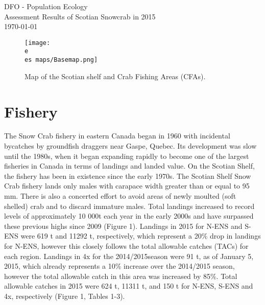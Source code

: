 \documentclass[paper=a4, fontsize=11pt]{article}
\newcommand{\e}{/home/michelle/ecomod_data/}
\newcommand{\es}{snowcrab/}
\begin{document}
  \begin{titlepage}
  \vspace*{\fill}
  \begin{center}
    {DFO - Population Ecology}\\[0.5cm]
    {Assessment Results of Scotian Snowcrab in 2015}\\[0.4cm]
    {\normalsize\today}
\begin{figure} [h]
\centering
  \texttt{[image: \\e \\es maps/Basemap.png]}
  \caption{Map of the Scotian shelf and Crab Fishing Areas (CFAs).}
 \end{figure}
 \end{center}
\vspace*{\fill}
\end{titlepage}


\section{Fishery}
The Snow Crab fishery in eastern Canada began in 1960 with incidental bycatches by groundfish draggers near Gaspe, Quebec. Its development was slow until the 1980s, when it began expanding rapidly to become one of the largest fisheries in Canada in terms of landings and landed value. On the Scotian Shelf, the fishery has been in existence since the early 1970s. The Scotian Shelf Snow Crab fishery lands only males with carapace width greater than or equal to 95 mm. There is also a concerted effort to avoid areas of newly moulted (soft shelled) crab and to discard immature males. Total landings increased to record levels of approximately 10 000t each year in the early 2000s and have surpassed these previous highs since 2009 (Figure 1). Landings in 2015 for N-ENS and S-ENS were 619 t and 11292 t, respectively, which represent a 20\% drop in landings for N-ENS, however this closely follows the total allowable catches (TACs) for each region. Landings in 4x for the 2014/2015season were 91 t, as of January 5, 2015, which already represents a 10\% increase over the 2014/2015 season, however the total allowable catch in this area was increased by 85\%. Total allowable catches in 2015 were 624 t, 11311 t, and 150 t for N-ENS, S-ENS and 4x, respectively (Figure 1, Tables 1-3). \\
\end{document}
